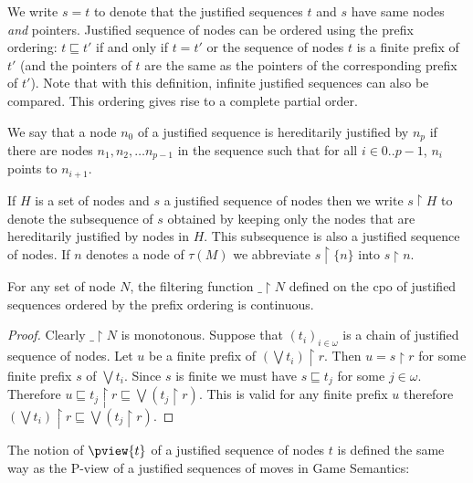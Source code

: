 We write $s = t$ to denote that the justified sequences $t$ and $s$
have same nodes \emph{and} pointers. Justified sequence of nodes can
be ordered using the prefix ordering: $t \sqsubseteq t'$ if and only
if $t=t'$ or the sequence of nodes $t$ is a finite prefix of $t'$
(and the pointers of $t$ are the same as the pointers of the
corresponding prefix of $t'$). Note that with this definition,
infinite justified sequences can also be compared. This ordering
gives rise to a complete partial order.

We say that a node $n_0$ of a justified sequence is hereditarily justified by $n_p$ if there are nodes $n_1, n_2, \ldots n_{p-1}$ in
the sequence such that for all $i\in 0..p-1$, $n_i$ points to $n_{i+1}$.

If $H$ is a set of nodes and $s$ a justified sequence of nodes then we write $s \upharpoonright H$ to denote the subsequence of $s$ obtained by keeping only the nodes that are hereditarily justified by nodes in $H$. This subsequence is also a justified
sequence of nodes. If $n$ denotes a node of $\tau(M)$ we abbreviate $s \upharpoonright \{ n \}$ into $ s\upharpoonright n$.

\begin{lemma}
\label{lem:filtercontinous}
For any set of node $N$, the filtering function $\_ \upharpoonright N$ defined on the cpo of justified sequences ordered by the prefix ordering
is continuous.
\end{lemma}
\begin{proof}
Clearly $\_ \upharpoonright N$ is monotonous.
Suppose that $(t_i)_{i\in\omega}$ is a chain of justified sequence of nodes. Let $u$ be a finite prefix of $(\bigvee t_i) \upharpoonright r$.
Then $u = s \upharpoonright r$ for some finite prefix $s$ of $\bigvee t_i$. Since $s$ is finite we must have $s \sqsubseteq t_j$ for some $j\in\omega$.
Therefore $u \sqsubseteq t_j \upharpoonright r \sqsubseteq \bigvee (t_j \upharpoonright r)$.
This is valid for any finite prefix $u$ therefore $(\bigvee t_i) \upharpoonright r \sqsubseteq \bigvee (t_j \upharpoonright r)$.
\end{proof}



The notion of  $\pview{t}$ of a justified sequence
of nodes $t$ is defined the same way as the P-view of a justified
sequences of moves in Game Semantics:

